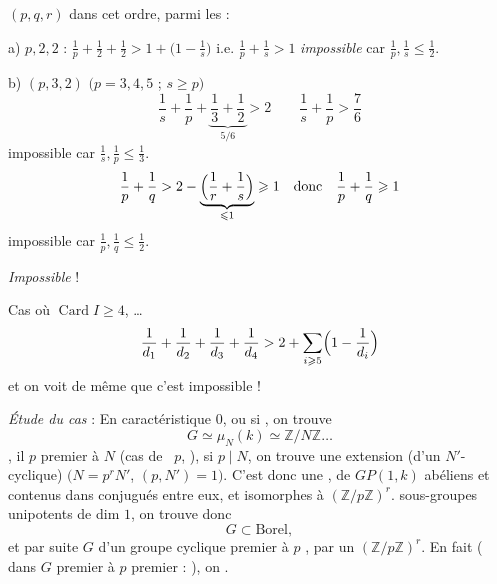 \documentclass[11pt,a4paper]{article}
\begin{document}
$(p, q, r)$ dans cet ordre, parmi les \struck{\ill{}}  :

a) $p, 2, 2$ :
$\frac{1}{p} + \frac{1}{2} + \frac{1}{2} > 1 + \bigl(1 - \frac{1}{s}\bigr)$
i.e. $\frac{1}{p} + \frac{1}{s} > 1$ \emph{impossible} car
$\frac{1}{p}, \frac{1}{s} \leqslant \frac{1}{2}$.

b) $(p, 3, 2)$ $(p = 3, 4, 5$ ; $s \geqslant p)$
\[
  \frac{1}{s} + \frac{1}{p} + \underbrace{\frac{1}{3} + \frac{1}{2}}_{5/6} > 2
  \qquad \frac{1}{s} + \frac{1}{p} > \frac{7}{6}
\]
impossible car $\frac{1}{s}, \frac{1}{p} \leqslant \frac{1}{3}$.
\[
  \frac{1}{p} + \frac{1}{q} > 2 - \underbrace{\Bigl(\frac{1}{r} + \frac{1}{s}\Bigr)}_{\leqslant 1} \geqslant 1
  \quad\text{donc}\quad \frac{1}{p} + \frac{1}{q} \geqslant 1
\]
impossible car $\frac{1}{p}, \frac{1}{q} \leqslant \frac{1}{2}$.

\emph{Impossible} !

Cas où $\operatorname{Card} I \geqslant 4$, \ldots
\[
  \frac{1}{d_1} + \frac{1}{d_2} + \frac{1}{d_3} + \frac{1}{d_4}
  > 2 + \sum_{i \geqslant 5} \Bigl(1 - \frac{1}{d_i}\Bigr)
\]
et on voit de même que c'est impossible !

\emph{Étude du cas} \struck{\ill{}}  :
En caractéristique $0$, ou si \ill{}, on trouve
\[
  G \simeq \mu_N(k) \simeq \mathbb{Z}/N\mathbb{Z} \ldots
\]
 \ill{}, il \ill{} $p$ premier à $N$
(cas de \ $p$, \ill{} ),
si $p \mid N$, on trouve une extension (d'un $N'$-cyclique)
\ill{} $(N = p^{r} N'$, $(p, N') = 1)$. C'est donc une
  ,
 \struck{\ill{}} 
 \ill{}
 \add{\ill{}}
 de $GP(1, k)$ \struck{\ill{}} abéliens et contenus dans
\ill{} conjugués entre eux, et isomorphes à $(\mathbb{Z}/p\mathbb{Z})^{r}$.
 sous-groupes unipotents de dim $1$, on trouve donc
\[
  G \subset \text{Borel},
\]
et par suite $G$  d'un groupe cyclique premier
à $p$ \ill{}, par un $(\mathbb{Z}/p\mathbb{Z})^{r}$. En fait
\ill{} \struck{\ill{}} (\ill{} dans $G$ premier à $p$ \ill{}
premier : \ill{}), on \ill{} \ill{}.
\end{document}
